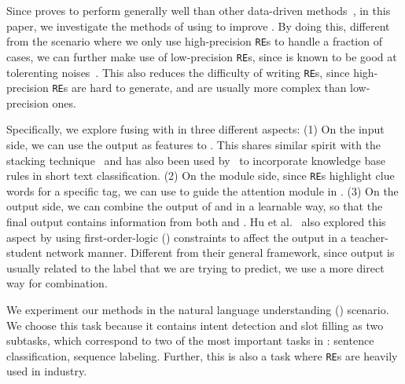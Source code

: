 Since \NN proves to perform generally well than other data-driven methods~\cite{kim2014convolutional, bahdanau2014neural}, in this paper,
we investigate the methods of using \RE to improve \NN. By doing this, different from the scenario where we only use high-precision
\texttt{RE}s to handle a fraction of cases, we can further make use of low-precision \texttt{RE}s, since \NN is known to be good at
tolerenting noises~\cite{xie2016disturblabel}. This also reduces the difficulty of writing \texttt{RE}s, since high-precision \texttt{RE}s
are hard to generate, and are usually more complex than low-precision ones.




Specifically, we explore fusing \RE with \NN in three different aspects: (1) On the \NN input side, we can use the \RE output as features
to \NN. This shares similar spirit with the stacking technique~\cite{wolpert1992stacked} and has also been used by~\cite{wangcombining17}
to incorporate knowledge base rules in short text classification.
(2) On the \NN module side, since \texttt{RE}s highlight clue words for a
specific tag, we can use \RE to guide the attention module in \NN. (3) On the \NN output side, we can combine the output of \RE and \NN in
a learnable way, so that the final output contains information from both \NN and \RE. Hu et al.~ also explored
this aspect by using first-order-logic (\FOL) constraints to affect the \NN output in a teacher-student network manner. Different from
their general framework, since \RE output is usually related to the label that we are trying to predict, we use a more direct way for
combination.

We experiment our methods in the natural language understanding (\NLU) scenario.
We choose this task because it contains intent detection and slot filling as two subtasks, which correspond to two of the most important tasks in \NLP: sentence classification, sequence labeling. Further, this is also a task where \texttt{RE}s are heavily used in industry.

